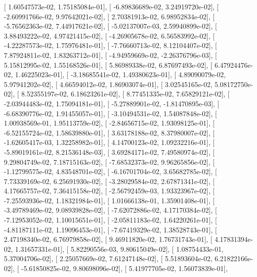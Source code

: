 \documentclass{article}
\begin{document}
       [  1.60547573e-02,   1.75185084e-01],
       [ -6.89836689e-02,   3.24919720e-02],
       [ -2.60991766e-02,   9.97642021e-02],
       [  2.70381913e-02,   6.98952834e-02],
       [ -5.76562363e-02,   7.44917621e-02],
       [ -5.02137007e-03,   2.59940899e-02],
       [  3.88493222e-02,   4.97421415e-02],
       [ -4.26905678e-02,   6.56583992e-02],
       [ -4.22287573e-02,   1.75976481e-01],
       [ -7.76660713e-02,   8.12104407e-02],
       [  7.87924811e-02,   1.83263712e-01],
       [ -4.94959669e-02,  -2.26376796e-03],
       [  5.15812995e-02,   1.55168526e-01],
       [  5.86989338e-02,   6.87697493e-02],
       [  6.47924476e-02,   1.46225023e-01],
       [ -3.18685541e-02,   1.49380623e-01],
       [  4.89090079e-02,   5.97941202e-02],
       [  4.66594012e-02,   1.86903074e-01],
       [  3.02545165e-02,   5.08172750e-02],
       [  8.52355197e-02,   6.18623261e-02],
       [  8.77451335e-02,   7.65829121e-02],
       [ -2.03944483e-02,   1.75094181e-01],
       [ -5.27889901e-02,  -1.81470895e-03],
       [ -6.68390776e-02,   1.91455057e-01],
       [ -3.10494531e-02,   1.54087848e-02],
       [  1.00938569e-01,   1.95113759e-02],
       [ -2.84656715e-02,   1.93098125e-01],
       [ -6.52155724e-02,   1.58639880e-01],
       [  3.63178188e-02,   8.37980007e-02],
       [ -1.62605417e-03,   1.32258982e-01],
       [  4.14700123e-02,   1.09232216e-01],
       [ -5.89019161e-02,   8.21536148e-03],
       [  3.69284171e-02,   7.49580974e-02],
       [  9.29804749e-02,   7.18715163e-02],
       [ -7.68532373e-02,   9.96265856e-02],
       [ -1.12799575e-02,   4.83548701e-02],
       [ -6.16701704e-02,   3.65682785e-02],
       [  7.73339169e-02,   6.25691930e-02],
       [ -3.28029584e-02,   2.67871341e-02],
       [  4.17665757e-02,   7.36415158e-02],
       [ -2.56792459e-03,   1.93323967e-02],
       [ -7.25593936e-02,   1.18321984e-01],
       [  1.01666138e-01,   1.35901408e-01],
       [ -3.49789469e-02,   9.08939828e-02],
       [ -7.62072886e-02,   4.17170384e-02],
       [ -7.12953052e-02,   1.10015651e-01],
       [ -2.05811183e-02,   1.64220261e-01],
       [ -4.81187111e-02,   1.19096453e-01],
       [ -7.67419329e-02,   1.38528743e-01],
       [  2.47198340e-02,   6.76979858e-02],
       [  9.46911820e-02,   1.76731743e-01],
       [  4.17831394e-02,   1.31657331e-01],
       [  5.82290556e-03,   9.80615049e-02],
       [  1.08754433e-01,   5.37004706e-02],
       [  2.25057669e-02,   7.61247148e-02],
       [  5.51893604e-02,   6.21822166e-02],
       [ -5.61850825e-02,   9.80698096e-02],
       [  5.41977705e-02,   1.56073839e-01],
\end{document}
